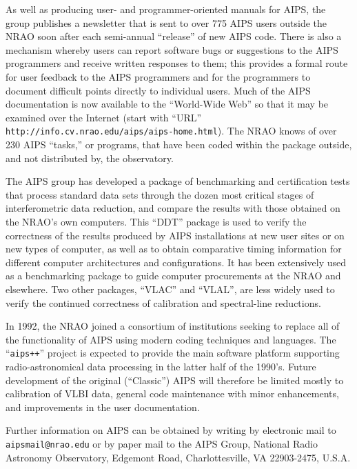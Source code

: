 As well as producing user- and programmer-oriented manuals for AIPS,
the group publishes a newsletter that is sent to over 775 AIPS users
outside the NRAO soon after each semi-annual ``release'' of new AIPS
code.  There is also a mechanism whereby users can report software
bugs or suggestions to the AIPS programmers and receive written
responses to them; this provides a formal route for user feedback to
the AIPS programmers and for the programmers to document difficult
points directly to individual users.  Much of the AIPS documentation
is now available to the ``World-Wide Web'' so that it may be examined
over the Internet (start with ``URL'' {\tt
http://info.cv.nrao.edu/aips/aips-home.html}).  The NRAO knows of over
230 AIPS ``tasks,'' or programs, that have been coded within the
package outside, and not distributed by, the observatory.

    The AIPS group has developed a package of benchmarking and
certification tests that process standard data sets through the dozen
most critical stages of interferometric data reduction, and compare
the results with those obtained on the NRAO's own computers.  This
``DDT'' package is used to verify the correctness of the results
produced by AIPS installations at new user sites or on new types of
computer, as well as to obtain comparative timing information for
different computer architectures and configurations.  It has been
extensively used as a benchmarking package to guide computer
procurements at the NRAO and elsewhere.  Two other packages, ``VLAC''
and ``VLAL'', are less widely used to verify the continued correctness
of calibration and spectral-line reductions.

     In 1992, the NRAO joined a consortium of institutions seeking to
replace all of the functionality of AIPS using modern coding
techniques and languages.  The ``{\tt aips++}'' project is expected to
provide the main software platform supporting radio-astronomical data
processing in the latter half of the 1990's.  Future development of
the original (``Classic'') AIPS will therefore be limited mostly to
calibration of VLBI data, general code maintenance with minor
enhancements, and improvements in the user documentation.

    Further information on AIPS can be obtained by writing by
electronic mail to {\tt aipsmail@nrao.edu} or by paper mail to the
AIPS Group, National Radio Astronomy Observatory, Edgemont Road,
Charlottesville, VA 22903-2475, U.S.A.

\vskip 0.75in
\centerline{\hss{}\hss}
\vfill\eject

